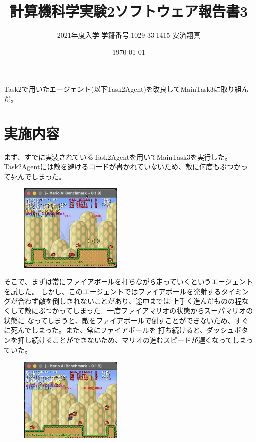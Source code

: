 \documentclass[a4paper,11pt]{jsarticle}
\begin{document}
\title{計算機科学実験2ソフトウェア報告書3}
\author{2021年度入学 学籍番号:1029-33-1415 安済翔真}
\date{\today}
\maketitle

Task2で用いたエージェント(以下Task2Agent)を改良してMainTask3に取り組んだ。

\section*{実施内容}

まず、すでに実装されているTask2Agentを用いてMainTask3を実行した。
Task2Agentには敵を避けるコードが書かれていないため、敵に何度もぶつかって死んでしまった。

\begin{figure}[h]
  \centering
  \includegraphics*[width=50mm]{
    images/report3/task2-agent.png
  }
  \caption[図1]{}
\end{figure}

そこで、まずは常にファイアボールを打ちながら走っていくというエージェントを試した。
しかし、このエージェントではファイアボールを発射するタイミングが合わず敵を倒しきれないことがあり、途中までは
上手く進んだものの程なくして敵にぶつかってしまった。一度ファイアマリオの状態からスーパマリオの状態に
なってしまうと、敵をファイアボールで倒すことができないため、すぐに死んでしまった。また、常にファイアボールを
打ち続けると、ダッシュボタンを押し続けることができないため、マリオの進むスピードが遅くなってしまっていた。


\begin{figure}
  \begin{center}
    \includegraphics*[width=50mm]{images/report3/falling-enemy.png}
    \caption[図2]{}
  \end{center}
\end{figure}
\end{document}
